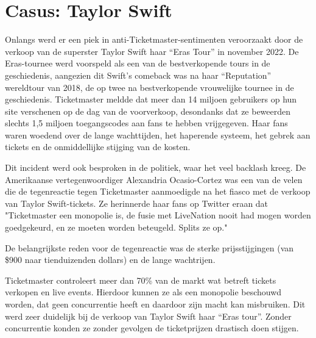 
\section{Casus: Taylor Swift}


Onlangs werd er een piek in anti-Ticketmaster-sentimenten veroorzaakt door de verkoop van de superster Taylor Swift haar “Eras Tour” in november 2022. 
De Eras-tournee werd voorspeld als een van de bestverkopende tours in de geschiedenis, aangezien dit Swift's comeback was na haar “Reputation” wereldtour van 2018, de op twee na bestverkopende vrouwelijke tournee in de geschiedenis.
Ticketmaster meldde dat meer dan 14 miljoen gebruikers op hun site verschenen op de dag van de voorverkoop, desondanks dat ze beweerden slechts 1,5 miljoen toegangscodes aan fans te hebben vrijgegeven. 
Haar fans waren woedend over de lange wachttijden, het haperende systeem, het gebrek aan tickets en de onmiddellijke stijging van de kosten.


Dit incident werd ook besproken in de politiek, waar het veel backlash kreeg.
De Amerikaanse vertegenwoordiger Alexandria Ocasio-Cortez was een van de velen die de tegenreactie tegen Ticketmaster aanmoedigde na het fiasco met de verkoop van Taylor Swift-tickets. Ze herinnerde haar fans op Twitter eraan dat "Ticketmaster een monopolie is, de fusie met LiveNation nooit had mogen worden goedgekeurd, en ze moeten worden beteugeld. Splits ze op."

De belangrijkste reden voor de tegenreactie was de sterke prijsstijgingen (van \$900 naar tienduizenden dollars) en de lange wachtrijen.


Ticketmaster controleert meer dan 70\% van de markt wat betreft tickets verkopen en live events.
Hierdoor kunnen ze als een monopolie beschouwd worden, dat geen concurrentie heeft en daardoor zijn macht kan misbruiken. Dit werd zeer duidelijk bij de verkoop van Taylor Swift haar “Eras tour”. Zonder concurrentie konden ze zonder gevolgen de ticketprijzen drastisch doen stijgen. 

